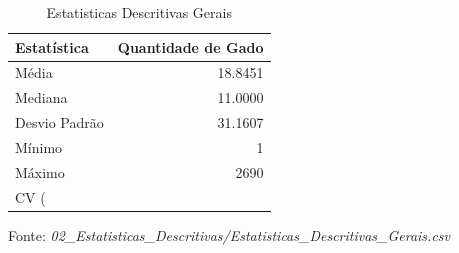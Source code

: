 \begin{table}[H]
\centering
\small
\caption{Estatisticas Descritivas Gerais}
\label{tab:02_02_Estatisticas_Descritivas}
\begin{tabular}{|l|r|}
\hline
\textbf{Estatística} & \textbf{Quantidade de Gado} \\
\hline
Média & 18.8451 \\
Mediana & 11.0000 \\
Desvio Padrão & 31.1607 \\
Mínimo & 1 \\
Máximo & 2690 \\
CV (%
\hline
\end{tabular}
\begin{flushleft}
\small Fonte: \textit{02_Estatisticas_Descritivas/Estatisticas_Descritivas_Gerais.csv}
\end{flushleft}
\end{table}

